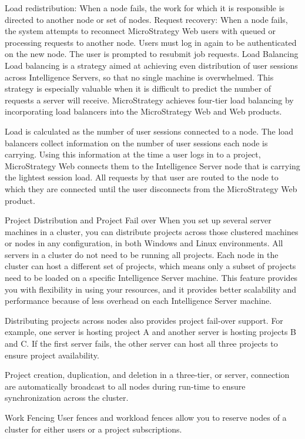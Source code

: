 \documentclass[12pt]{article}
\begin{document}
Load redistribution: When a node fails, the work for which it is responsible is directed to another node or set of nodes.
Request recovery: When a node fails, the system attempts to reconnect MicroStrategy Web users with queued or processing requests to another node. Users must log in again to be authenticated on the new node. The user is prompted to resubmit job requests.
Load Balancing
Load balancing is a strategy aimed at achieving even distribution of user sessions across Intelligence Servers, so that no single machine is overwhelmed. This strategy is especially valuable when it is difficult to predict the number of requests a server will receive. MicroStrategy achieves four-tier load balancing by incorporating load balancers into the MicroStrategy Web and Web products.

Load is calculated as the number of user sessions connected to a node. The load balancers collect information on the number of user sessions each node is carrying. Using this information at the time a user logs in to a project, MicroStrategy Web connects them to the Intelligence Server node that is carrying the lightest session load. All requests by that user are routed to the node to which they are connected until the user disconnects from the MicroStrategy Web product.

Project Distribution and Project Fail over
When you set up several server machines in a cluster, you can distribute projects across those clustered machines or nodes in any configuration, in both Windows and Linux environments. All servers in a cluster do not need to be running all projects. Each node in the cluster can host a different set of projects, which means only a subset of projects need to be loaded on a specific Intelligence Server machine. This feature provides you with flexibility in using your resources, and it provides better scalability and performance because of less overhead on each Intelligence Server machine.

Distributing projects across nodes also provides project fail-over support. For example, one server is hosting project A and another server is hosting projects B and C. If the first server fails, the other server can host all three projects to ensure project availability.

Project creation, duplication, and deletion in a three-tier, or server, connection are automatically broadcast to all nodes during run-time to ensure synchronization across the cluster.

Work Fencing
User fences and workload fences allow you to reserve nodes of a cluster for either users or a project subscriptions. 
\end{document}
